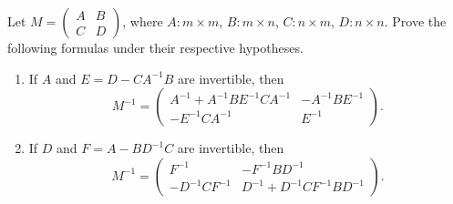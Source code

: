 \begin{problem}\label{ex:05:block-inverse}
Let
\(M=\begin{pmatrix}A&B\\C&D\end{pmatrix}\), where
\(A:m\times m\), \(B:m\times n\), \(C:n\times m\), \(D:n\times n\).
Prove the following formulas under their respective hypotheses.
\begin{enumerate}
\item If \(A\) and \(E=D-CA^{-1}B\) are invertible, then
\[
M^{-1}=\begin{pmatrix}
A^{-1}+A^{-1}BE^{-1}CA^{-1}&-A^{-1}BE^{-1}\\
-E^{-1}CA^{-1}&E^{-1}
\end{pmatrix}.
\]
\item If \(D\) and \(F=A-BD^{-1}C\) are invertible, then
\[
M^{-1}=\begin{pmatrix}
F^{-1}&-F^{-1}BD^{-1}\\
-D^{-1}CF^{-1}&D^{-1}+D^{-1}CF^{-1}BD^{-1}
\end{pmatrix}.
\]
\end{enumerate}
\end{problem}
